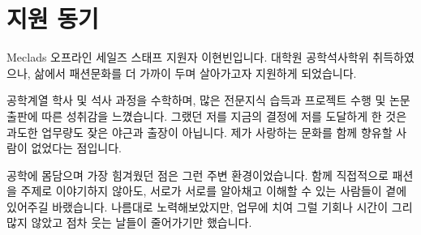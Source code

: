  
 
 
 

\section*{지원 동기}
Meclads 오프라인 세일즈 스태프 지원자 이현빈입니다. 대학원 공학석사학위 취득하였으나, 삶에서 패션문화를 더 가까이 두며 살아가고자 지원하게 되었습니다.

공학계열 학사 및 석사 과정을 수학하며, 많은 전문지식 습득과 프로젝트 수행 및 논문출판에 따른 성취감을 느꼈습니다. 그랬던 저를 지금의 결정에 저를 도달하게 한 것은 과도한 업무량도 잦은 야근과 출장이 아닙니다. 제가 사랑하는 문화를 함께 향유할 사람이 없었다는 점입니다.

공학에 몸담으며 가장 힘겨웠던 점은 그런 주변 환경이었습니다. 함께 직접적으로 패션을 주제로 이야기하지 않아도, 서로가 서로를 알아채고 이해할 수 있는 사람들이 곁에 있어주길 바랬습니다. 나름대로 노력해보았지만, 업무에 치여 그럴 기회나 시간이 그리 많지 않았고 점차 웃는 날들이 줄어가기만 했습니다.


